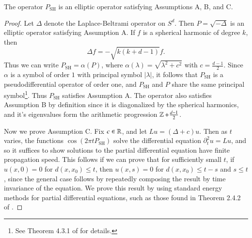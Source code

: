 \begin{lemma} \label{lemmaoijioawjdioawjdw}
  The operator $P_{\text{SH}}$ is an elliptic operator satisfying Assumptions A, B, and C.
\end{lemma}
\begin{proof}
  Let $\Delta$ denote the Laplace-Beltrami operator on $S^d$. Then $P = \sqrt{-\Delta}$ is an elliptic operator satisfying Assumption A. If $f$ is a spherical harmonic of degree $k$, then
  \begin{equation}
    \Delta f = - \sqrt{k(k+d-1)} f.
  \end{equation}
  Thus we can write $P_{\text{SH}} = \alpha(P)$, where $\alpha(\lambda) = \sqrt{ \lambda^2 + c^2 }$ with $c = \tfrac{d-1}{2}$. Since $\alpha$ is a symbol of order $1$ with principal symbol $|\lambda|$, it follows that $P_{\text{SH}}$ is a pseudodifferential operator of order one, and $P_{\text{SH}}$ and $P$ share the same principal symbol\footnote{See Theorem 4.3.1 of \cite{Sogge} for details.}. Thus $P_{\text{SH}}$ satisfies Assumption A. The operator also satisfies Assumption B by definition since it is diagonalized by the spherical harmonics, and it's eigenvalues form the arithmetic progression $\operatorname{\mathbb{Z}} + \tfrac{d-1}{2}$.

  Now we prove Assumption C. Fix $c \in \operatorname{\mathbb{R}}$, and let $Lu = (\Delta + c) u$. Then as $t$ varies, the functions $\cos(2 \pi t P_{\text{SH}})$ solve the differential equation $\partial_t^2 u = Lu$, and so it suffices to show solutions to the partial differential equation have finite propagation speed. This follows if we can prove that for sufficiently small $t$, if $u(x,0) = 0$ for $d(x,x_0) \leq t$, then $u(x,s) = 0$ for $d(x,x_0) \leq t - s$ and $s \leq t$, since the general case follows by repeatedly composing the result by time invariance of the equation. We prove this result by using standard energy methods for partial differential equations, such as those found in Theorem 2.4.2 of \cite{SoggeHangzhou}.


\end{proof}
